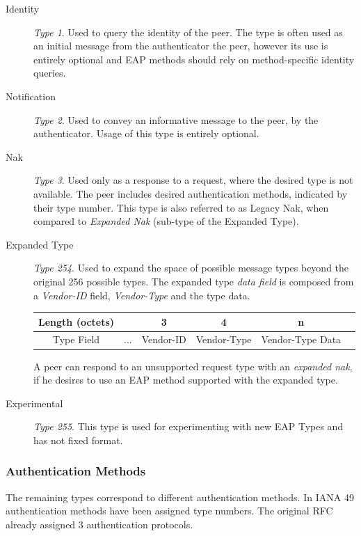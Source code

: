\begin{description}
	\item[Identity] \textit{Type 1}. Used to query the identity of the peer. The type is often used as an initial message from the authenticator the peer, however its use is entirely optional and EAP methods should rely on method-specific identity queries.
	
	\item[Notification]\textit{Type 2}. Used to convey an informative message to the peer, by the authenticator. Usage of this type is entirely optional.
	\item[Nak]\textit{Type 3}. Used only as a response to a request, where the desired type is not available.
	The peer includes desired authentication methods, indicated by their type number.
	This type is also referred to as Legacy Nak, when compared to \textit{Expanded Nak} (sub-type of the Expanded Type).
	\item[Expanded Type] \textit{Type 254}. 
	Used to expand the space of possible message types beyond the original 256 possible types.
	The expanded type \textit{data field} is composed from a \textit{Vendor-ID} field, \textit{Vendor-Type} and the type data.
	\bigskip
	\begin{center}
		\begin{tabular}{|c|c|c|c|c|c|}
		\cline{2-5}
		\hline
		Length (octets) & & 3 & 4 & n\\
		\hline
		Type Field & ... & Vendor-ID & Vendor-Type & Vendor-Type Data\\
		\hline
		\end{tabular}
	\end{center}
	\bigskip
	A peer can respond to an unsupported request type with an \textit{expanded nak}, if he desires to use an EAP method supported with the expanded type.
	\item[Experimental] \textit{Type 255}. This type is used for experimenting with new EAP Types and has not fixed format.
\end{description}

\subsubsection{Authentication Methods}
The remaining types correspond to different authentication methods.
In IANA \cite{joseph2004eap} 49 authentication methods have been assigned type numbers.
The original RFC \cite{aboba2004extensible} already assigned 3 authentication protocols.

